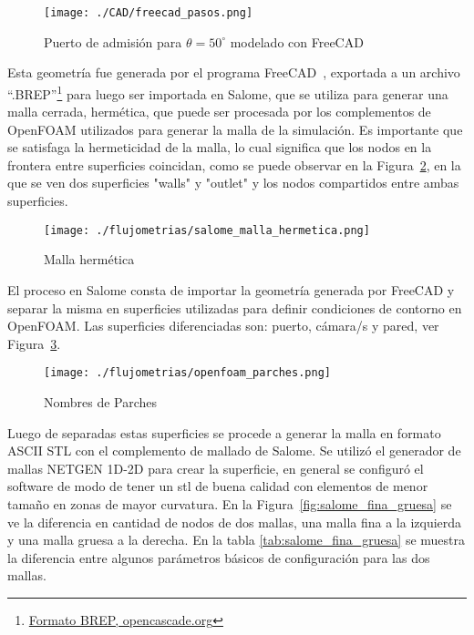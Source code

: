 \begin{figure}
    \centering
    \texttt{[image: ./CAD/freecad\_pasos.png]}
    \caption{Puerto de admisión para $\theta=50^{\circ}$ modelado con
FreeCAD}\label{fig:admision_50}
\end{figure}

Esta geometría fue generada por el programa FreeCAD~\parencite{freecad},
exportada a un archivo
``.BREP''\footnote{\href{https://dev.opencascade.org/doc/overview/html/specification\_\_brep\_format.html}{Formato
BREP, opencascade.org}} para luego ser importada en Salome\parencite{salome},
que se utiliza para generar una malla cerrada, hermética, que puede ser
procesada por los complementos de OpenFOAM utilizados para generar la malla de
la simulación.
%
Es importante que se satisfaga la hermeticidad de la malla, lo cual significa
que los nodos en la frontera entre superficies coincidan, como se puede observar
en la Figura~\ref{fig:salome_malla_hermetica}, en la que se ven dos superficies
"walls" y "outlet" y los nodos compartidos entre ambas superficies.
%

\begin{figure}[ht]
    \centering
    \texttt{[image: ./flujometrias/salome\_malla\_hermetica.png]}
    \caption{Malla hermética}\label{fig:salome_malla_hermetica}
\end{figure}

El proceso en Salome consta de importar la geometría generada por FreeCAD y
separar la misma en superficies utilizadas para definir condiciones de contorno
en OpenFOAM.
%
Las superficies diferenciadas son: puerto, cámara/s y pared, ver
Figura~\ref{fig:openfoam_parches}.

\begin{figure}[ht]
    \centering
    \texttt{[image: ./flujometrias/openfoam\_parches.png]}
    \caption{Nombres de Parches}\label{fig:openfoam_parches}
\end{figure}

Luego de separadas estas superficies se procede a generar la malla en formato
ASCII STL con el complemento de mallado de Salome.
%
Se utilizó el generador de mallas NETGEN 1D-2D para crear la superficie, en
general se configuró el software de modo de tener un stl de buena calidad con
elementos de menor tamaño en zonas de mayor curvatura.
%
En la Figura~\ref{fig:salome_fina_gruesa} se ve la diferencia en cantidad de
nodos de dos mallas, una malla fina a la izquierda y una malla gruesa a la
derecha.
%
En la tabla \ref{tab:salome_fina_gruesa} se muestra la diferencia entre algunos
parámetros básicos de configuración para las dos mallas.
%

